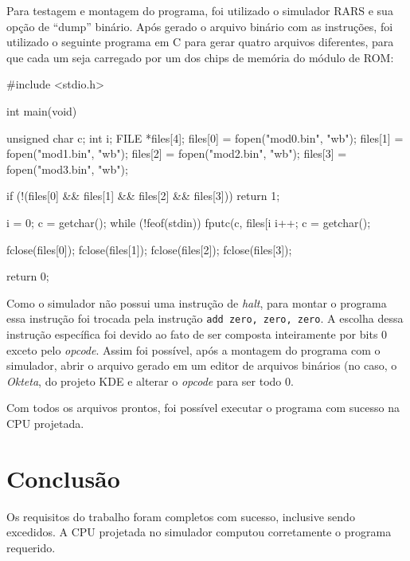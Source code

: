 \documentclass[twocolumn]{article}
\begin{document}
Para testagem e montagem do programa, foi utilizado o simulador
RARS\cite{rars} e sua opção de ``dump'' binário. Após gerado o arquivo binário
com as instruções, foi utilizado o seguinte programa em C para gerar quatro
arquivos diferentes, para que cada um seja carregado por um dos chips de memória
do módulo de ROM:

\begin{spverbatim}
#include <stdio.h>

int main(void)
{
        unsigned char c;
        int i;
        FILE *files[4];
        files[0] = fopen("mod0.bin", "wb");
        files[1] = fopen("mod1.bin", "wb");
        files[2] = fopen("mod2.bin", "wb");
        files[3] = fopen("mod3.bin", "wb");

        if (!(files[0] && files[1] && files[2] && files[3]))
                return 1;

        i = 0;
        c = getchar();
        while (!feof(stdin)) {
                fputc(c, files[i %
                i++;
                c = getchar();
        }

        fclose(files[0]);
        fclose(files[1]);
        fclose(files[2]);
        fclose(files[3]);

        return 0;
}
\end{spverbatim}

Como o simulador não possui uma instrução de \textit{halt}, para montar o
programa essa instrução foi trocada pela instrução
\verb|add zero, zero, zero|. A escolha dessa instrução específica foi devido ao
fato de ser composta inteiramente por bits 0 exceto pelo \textit{opcode}. Assim
foi possível, após a montagem do programa com o simulador, abrir o arquivo
gerado em um editor de arquivos binários (no caso, o \textit{Okteta}, do projeto
KDE\cite{okteta} e alterar o \textit{opcode} para ser todo 0.

Com todos os arquivos prontos, foi possível executar o programa com sucesso na
CPU projetada.

\section{Conclusão}

Os requisitos do trabalho foram completos com sucesso, inclusive sendo
excedidos. A CPU projetada no simulador computou corretamente o programa
requerido.

{}

\end{document}
